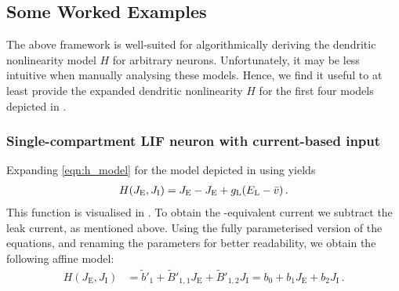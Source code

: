 \subsection{Some Worked Examples}
\label{sec:nlif_examples}

The above framework is well-suited for algorithmically deriving the dendritic nonlinearity model $H$ for arbitrary \nlif neurons.
Unfortunately, it may be less intuitive when manually analysing these models.
Hence, we find it useful to at least provide the expanded dendritic nonlinearity $H$ for the first four models depicted in .

\subsubsection{Single-compartment LIF neuron with current-based input}
Expanding \cref{eqn:h_model} for the model depicted in  using  yields 
\begin{align*}
	H(J_\mathrm{E}, J_\mathrm{I}) = J_\mathrm{E} - J_\mathrm{E} + g_\mathrm{L}(E_\mathrm{L} - {{\bar v}}) \,.
\end{align*}
This function is visualised in . To obtain the \LIF-equivalent current we subtract the leak current, as mentioned above.
Using the fully parameterised version of the equations, and renaming the parameters for better readability, we obtain the following affine model:
\begin{align*}
	H(J_\mathrm{E}, J_\mathrm{I}) &= \tilde b'_1 + \tilde B'_{1, 1} J_\mathrm{E} + \tilde B'_{1, 2} J_\mathrm{I} = b_0 + b_1 J_\mathrm{E} + b_2 J_\mathrm{I} \,.
\end{align*}

